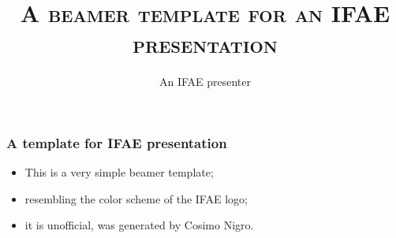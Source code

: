 \documentclass[10pt, xcolor=x11names, compress]{beamer}
\title[IFAE presentation]{
\color{ifaegreen}
\setstretch{0.8}
\textsc{A beamer template for an IFAE presentation}
}
\author[IFAE presenter]{An IFAE presenter}
\begin{document}
\frame{\titlepage}


\begin{frame}
\frametitle{A template for IFAE presentation}
\begin{itemize}
\item This is a very simple beamer template;
\item resembling the color scheme of the IFAE logo;
\item it is unofficial, was generated by Cosimo Nigro.
\end{itemize}
\end{frame}
\end{document}
